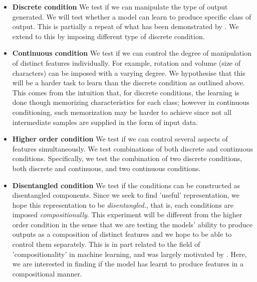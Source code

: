 \documentclass[11pt, letterpaper, oneside]{article}
\begin{document}
\begin{itemize}
\item \textbf{Discrete condition} We test if we can manipulate the type of output generated. We will test whether a model can learn to produce specific class of output. This is partially a repeat of what has been demonstrated by \cite{mirza_conditional_nodate}. We extend to this by imposing different type of discrete condition.

\item \textbf{Continuous condition} We test if we can control the degree of manipulation of distinct features individually. For example, rotation and volume (size of characters) can be imposed with a varying degree. We hypothesise that this will be a harder task to learn than the discrete condition as outlined above. This comes from the intuition that, for discrete conditions, the learning is done though memorizing characteristics for each class; however in continuous conditioning, such memorization may be harder to achieve since not all intermediate samples are supplied in the form of input data.  

\item \textbf{Higher order condition} We test if we can control several aspects of features simultaneously. We test combinations of both discrete and continuous conditions. Specifically, we test the combination of two discrete conditions, both discrete and continuous, and two continuous conditions.

\item \textbf{Disentangled condition} We test if the conditions can be constructed as disentangled components. Since we seek to find 'useful' representation, we hope this representation to be \textit{disentangled.}, that is, each conditions are imposed \textit{compositionally}. This experiment will be different from the higher order condition in the sense that we are testing the models' ability to produce outputs as a composition of distinct features and we hope to be able to control them separately. This is in part related to the field of 'compositionality' in machine learning, and was largely motivated by \cite{hupkes_compositionality_2020}. Here, we are interested in finding if the model has learnt to produce features in a compositional manner.

\end{itemize}
\end{document}
